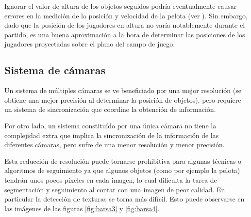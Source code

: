 Ignorar el valor de altura de los objetos seguidos podría eventualmente causar
errores en la medición de la posición y velocidad de la pelota (ver
\cite{Liu20061146}). Sin embargo, dado que la posición de los jugadores en
altura no varía notablemente durante el partido, es una buena aproximación a la
hora de determinar las posiciones de los jugadores proyectadas sobre el plano
del campo de juego.

\subsection{Sistema de cámaras}
\label{sub-sec:camaras}

Un sistema de múltiples cámaras se ve beneficiado por una mejor resolución (se
obtiene una mejor precisión al determinar la posición de objetos), pero
requiere un sistema de sincronización que coordine la obtención de información.

Por otro lado, un sistema constituído por una única cámara no tiene la
complejidad extra que implica la sincronización de la información de las
diferentes cámaras, pero sufre de una menor resolución y menor precisión.

Esta reducción de resolución puede tornarse prohibitiva para algunas técnicas o
algoritmos de seguimiento ya que algunos objetos (como por ejemplo la pelota)
tendrán unos pocos píxeles en cada imagen, lo cual dificulta la tarea de
segmentación y seguimiento al contar con una imagen de peor calidad. En
particular la detección de texturas se torna más difícil. Esto puede observarse
en las imágenes de las figuras \ref{fig:barsa3} y \ref{fig:barsa4}.

